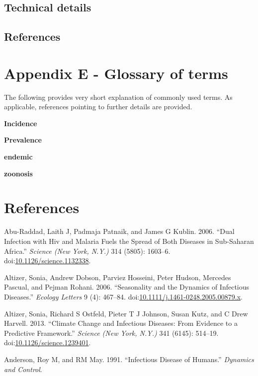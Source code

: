 \documentclass[]{book}
\theoremstyle{definition}
\theoremstyle{definition}
\theoremstyle{definition}
\theoremstyle{remark}
\begin{document}
\section{Technical details}\label{technical-details}

\section{References}\label{references-22}

\chapter{Appendix E - Glossary of terms}\label{glossary}

The following provides very short explanation of commonly used terms. As
applicable, references pointing to further details are provided.

\textbf{Incidence}

\textbf{Prevalence}

\textbf{endemic}

\textbf{zoonosis}

\chapter{References}\label{references}

\hypertarget{refs}{}
\hypertarget{ref-abu-raddad06}{}
Abu-Raddad, Laith J, Padmaja Patnaik, and James G Kublin. 2006. ``Dual
Infection with Hiv and Malaria Fuels the Spread of Both Diseases in
Sub-Saharan Africa.'' \emph{Science (New York, N.Y.)} 314 (5805):
1603--6.
doi:\href{https://doi.org/10.1126/science.1132338}{10.1126/science.1132338}.

\hypertarget{ref-altizer06}{}
Altizer, Sonia, Andrew Dobson, Parviez Hosseini, Peter Hudson, Mercedes
Pascual, and Pejman Rohani. 2006. ``Seasonality and the Dynamics of
Infectious Diseases.'' \emph{Ecology Letters} 9 (4): 467--84.
doi:\href{https://doi.org/10.1111/j.1461-0248.2005.00879.x}{10.1111/j.1461-0248.2005.00879.x}.

\hypertarget{ref-altizer13}{}
Altizer, Sonia, Richard S Ostfeld, Pieter T J Johnson, Susan Kutz, and C
Drew Harvell. 2013. ``Climate Change and Infectious Diseases: From
Evidence to a Predictive Framework.'' \emph{Science (New York, N.Y.)}
341 (6145): 514--19.
doi:\href{https://doi.org/10.1126/science.1239401}{10.1126/science.1239401}.

\hypertarget{ref-anderson91}{}
Anderson, Roy M, and RM May. 1991. ``Infectious Disease of Humans.''
\emph{Dynamics and Control}.
\end{document}
